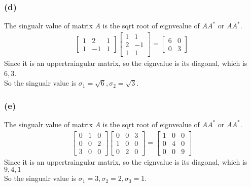 \documentclass{article}
\begin{document}
\subsubsection*{(d)}
The singualr value of matrix $A$ is the sqrt root of eignvealue of $AA^*$ or $AA^*$.
\begin{equation*}
    \begin{split}
        \begin{bmatrix}
            1 & 2 & 1 \\ 1 & -1 & 1
        \end{bmatrix}\begin{bmatrix}
            1 & 1 \\ 2 & -1 \\ 1 & 1
        \end{bmatrix} = \begin{bmatrix}
            6 & 0 \\ 0 & 3 
        \end{bmatrix}
    \end{split}
\end{equation*}
Since it is an uppertraingular matrix, so the eignvalue is its diagonal, which is $6, 3$.\\
So the singualr value is $\sigma_1 = \sqrt{6}, \sigma_2 = \sqrt{3}$.

\subsubsection*{(e)}
The singualr value of matrix $A$ is the sqrt root of eignvealue of $AA^*$ or $AA^*$.
\begin{equation*}
    \begin{split}
        \begin{bmatrix}
            0 & 1 & 0 \\ 0 & 0 &2 \\ 3 & 0 & 0
        \end{bmatrix} \begin{bmatrix}
            0 & 0 & 3 \\ 1 & 0 & 0 \\ 0 & 2 & 0
        \end{bmatrix} = \begin{bmatrix}
            1 & 0 & 0 \\ 0 & 4 & 0 \\ 0 & 0 & 9
        \end{bmatrix}
    \end{split}
\end{equation*}
Since it is an uppertraingular matrix, so the eignvalue is its diagonal, which is$9, 4, 1$ \\
So the singualr value is $\sigma_1 = 3, \sigma_2 = 2, \sigma_3 = 1$.
\end{document}
